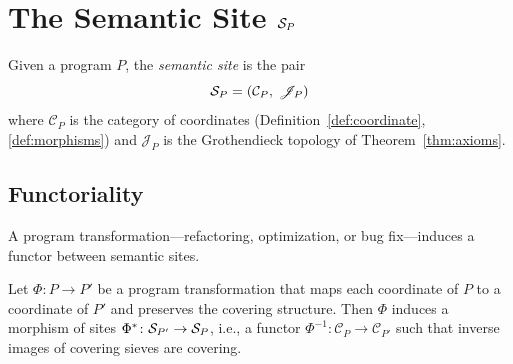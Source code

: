 \documentclass[11pt]{article}
\begin{document}
\section{The Semantic Site $\mathcal{S}_P$}\label{sec:site}

\begin{construction}\label{con:site}
Given a program $P$, the \emph{semantic site} is the pair
\[
  \mathcal{S}_P = (\mathcal{C}_P,\; \mathscr{J}_P)
\]
where $\mathcal{C}_P$ is the category of coordinates
(Definition~\ref{def:coordinate}, \ref{def:morphisms}) and $\mathscr{J}_P$
is the Grothendieck topology of Theorem~\ref{thm:axioms}.
\end{construction}

\subsection{Functoriality}

A program transformation---refactoring, optimization, or bug fix---induces a
functor between semantic sites.

\begin{theorem}[Functoriality]\label{thm:functoriality}
Let $\Phi \colon P \to P'$ be a program transformation that maps each
coordinate of $P$ to a coordinate of $P'$ and preserves the covering
structure.  Then $\Phi$ induces a morphism of sites
$\Phi^* \colon \mathcal{S}_{P'} \to \mathcal{S}_P$, i.e., a functor
$\Phi^{-1} \colon \mathcal{C}_{P} \to \mathcal{C}_{P'}$ such that inverse
images of covering sieves are covering.
\end{theorem}
\end{document}
